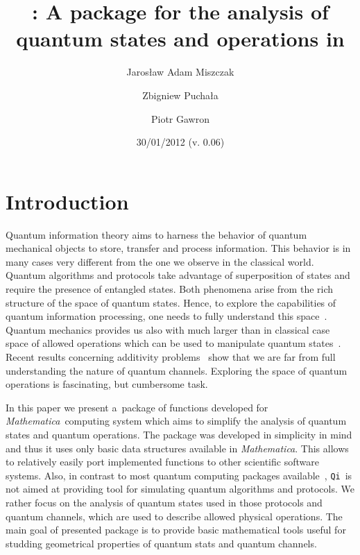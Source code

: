 \documentclass[11pt,a4paper]{article}
\date{30/01/2012 (v. 0.06)}
\title{\qi: A package for the analysis of quantum states and operations in
\Mathematica}
\author{Jarosław Adam Miszczak \and Zbigniew Pucha\l{}a \and Piotr Gawron}
\newcommand{\qi}{\texttt{Qi}}
\newcommand{\Mathematica}{\emph{Mathematica}}
\newcommand{\1}{{\bf 1}}
\begin{document}
\maketitle

\begin{abstract}
\end{abstract}

\section{Introduction}
Quantum information theory aims to harness the behavior of quantum mechanical
objects to store, transfer and process information. This behavior is in many
cases very different from the one we observe in the classical world. Quantum
algorithms and protocols take advantage of superposition of states and require
the presence of entangled states. Both phenomena arise from the rich structure
of the space of quantum states. Hence, to explore the capabilities of quantum
information processing, one needs to fully understand this space~\cite{BZ06}.
Quantum mechanics provides us also with much larger than in classical case space
of allowed operations which can be used to manipulate quantum
states~\cite{BZ06}. Recent results concerning additivity
problems~\cite{hastings09superadditivity} show that we are far from full
understanding the nature of quantum channels. Exploring the space of quantum
operations is fascinating, but cumbersome task.

In this paper we present a~package of functions developed for \Mathematica\
computing system which aims to simplify the analysis of quantum states and
quantum operations. The package was developed in simplicity in mind and thus it
uses only basic data structures available in \Mathematica. This allows to
relatively easily port implemented functions to other scientific software
systems. Also, in contrast to most quantum computing packages
available~\cite{quantum2, qdensity, qcwave, qucalc}, \qi\ is not aimed at
providing tool for simulating quantum algorithms and protocols. We rather focus
on the analysis of quantum states used in those protocols and quantum channels,
which are used to describe allowed physical operations. The main goal of
presented package is to provide basic mathematical tools useful for studding
geometrical properties of quantum stats and quantum channels.
\end{document}
